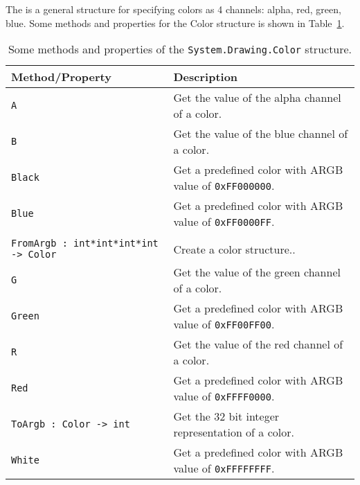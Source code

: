 The  is a general structure for specifying colors as 4 channels: alpha, red, green, blue. Some methods and properties for the Color structure is shown in Table~\ref{tab:color}.
\begin{table}
  \begin{center}
    \begin{tabularx}{\linewidth}{|l|X|}
      \hline
      \rowcolor{headerRowColor}  Method/Property & Description\\
      \hline
      \lstinline{A}
      &Get the value of the alpha channel of a color.\\
      \hline
      \lstinline{B}
      &Get the value of the blue channel of a color.\\
      \hline
      \lstinline{Black}
      &Get a predefined color with ARGB value of \lstinline{0xFF000000}.\\
      \hline
      \lstinline{Blue}
      &Get a predefined color with ARGB value of \lstinline{0xFF0000FF}.\\
      \hline
      \begin{minipage}{0.45\linewidth}
        \lstinline{FromArgb : int -> Color}\\
        \lstinline{FromArgb : int*int*int*int -> Color}
      \end{minipage}
      &Create a color structure..\\
      \hline
      \lstinline{G}
      &Get the value of the green channel of a color.\\
      \hline
      \lstinline{Green}
      &Get a predefined color with ARGB value of \lstinline{0xFF00FF00}.\\
      \hline
      \lstinline{R}
      &Get the value of the red channel of a color.\\
      \hline
      \lstinline{Red}
      &Get a predefined color with ARGB value of \lstinline{0xFFFF0000}.\\
      \hline
      \lstinline{ToArgb : Color -> int}
      &Get the 32 bit integer representation of a color.\\
      \hline
      \lstinline{White}
      &Get a predefined color with ARGB value of \lstinline{0xFFFFFFFF}.\\
      \hline
    \end{tabularx}
  \end{center}
  \caption{Some methods and properties of the \lstinline{System.Drawing.Color}  structure.}
  \label{tab:color}
\end{table}
